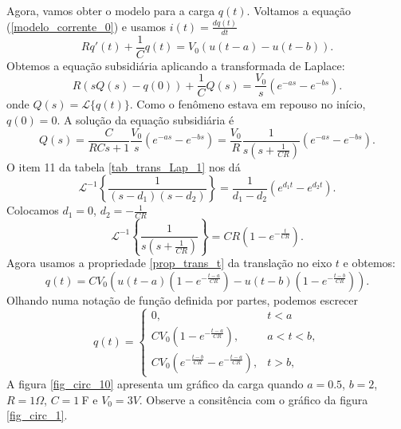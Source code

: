 \documentclass[Main.tex]{subfiles}
\begin{document}
Agora, vamos obter o modelo para a carga $q(t)$. Voltamos a equação (\ref{modelo_corrente_0}) e usamos $i(t)=\frac{dq(t)}{dt}$
$$
 Rq'(t)+\frac{1}{C}q(t)=V_0\left(u(t-a)-u(t-b)\right).
$$
Obtemos a equação subsidiária aplicando a transformada de Laplace:
\begin{equation*}
  R\left(sQ(s)-q(0)\right)+\frac{1}{C}Q(s)=\frac{V_0}{s}\left(e^{-as}-e^{-bs}\right).
\end{equation*}
onde $Q(s)=\mathcal{L}\{q(t)\}$. Como o fenômeno estava em repouso no início, $q(0)=0$. A solução da equação subsidiária é
$$
Q(s)=\frac{C}{RCs+1}\frac{V_0}{s}\left(e^{-as}-e^{-bs}\right)=\frac{V_0}{R}\frac{1}{s\left(s+\frac{1}{CR}\right)}\left(e^{-as}-e^{-bs}\right).
$$
O item 11 da tabela \ref{tab_trans_Lap_1} nos dá 
$$
\mathcal{L}^{-1}\left\{\frac{1}{(s-d_1)(s-d_2)}\right\}=\frac{1}{d_1-d_2}\left(e^{d_1t}-e^{d_2t}\right).
$$
Colocamos $d_1=0$, $d_2=-\frac{1}{CR}$ 
$$
\mathcal{L}^{-1}\left\{\frac{1}{s\left(s+\frac{1}{CR}\right)}\right\}=CR\left(1-e^{-\frac{t}{CR}}\right).
$$
Agora usamos a propriedade \ref{prop_trans_t} da translação no eixo $t$ e obtemos:
$$
q(t)=CV_0\left(u(t-a)\left(1-e^{-\frac{t-a}{CR}}\right)-u(t-b)\left(1-e^{-\frac{t-b}{CR}}\right) \right).
$$
Olhando numa notação de função definida por partes, podemos escrecer
$$
q(t)=\left\{\begin{array}{ll}0,&t<a  \\ CV_0\left(1-e^{-\frac{t-a}{CR}}\right), &a<t<b, \\ CV_0\left(e^{-\frac{t-b}{CR}}-e^{-\frac{t-a}{CR}} \right), &t>b, \end{array}\right.
$$
A figura \ref{fig_circ_10} apresenta um gráfico da carga quando $a=0.5$, $b=2$, $R=1\Omega$, $C=1\ \!$F e $V_0=3V$. Observe a consitência com o gráfico da figura \ref{fig_circ_1}.
\end{document}
